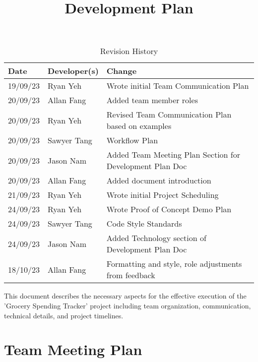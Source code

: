 \documentclass{article}
\title{Development Plan\\\progname}
\author{\authname}
\date{}
\begin{document}
\maketitle

\begin{table}[hp]
\caption{Revision History} \label{TblRevisionHistory}
\begin{tabularx}{\textwidth}{llX}
\toprule
\textbf{Date} & \textbf{Developer(s)} & \textbf{Change}\\
\midrule
19/09/23 & Ryan Yeh & Wrote initial Team Communication Plan\\
20/09/23 & Allan Fang & Added team member roles\\
20/09/23 & Ryan Yeh & Revised Team Communication Plan based on examples\\
20/09/23 & Sawyer Tang & Workflow Plan\\
20/09/23 & Jason Nam & Added Team Meeting Plan Section for Development Plan Doc\\
20/09/23 & Allan Fang & Added document introduction\\
21/09/23 & Ryan Yeh & Wrote initial Project Scheduling\\
24/09/23 & Ryan Yeh & Wrote Proof of Concept Demo Plan\\
24/09/23 & Sawyer Tang & Code Style Standards\\
24/09/23 & Jason Nam & Added Technology section of Development Plan Doc\\
18/10/23 & Allan Fang & Formatting and style, role adjustments from feedback \\
\bottomrule
\end{tabularx}
\end{table}

This document describes the necessary aspects for the effective execution of the 'Grocery Spending Tracker' project including team organization, communication, technical details, and project timelines.

\section{Team Meeting Plan}
\end{document}
